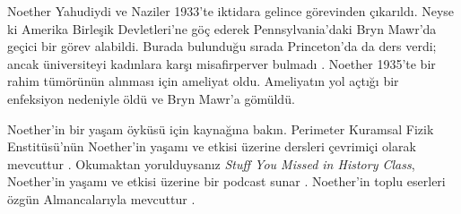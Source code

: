 Noether Yahudiydi ve Naziler 1933'te iktidara gelince görevinden çıkarıldı.
Neyse ki Amerika Birleşik Devletleri'ne göç ederek Pennsylvania'daki Bryn
Mawr'da geçici bir görev alabildi. Burada bulunduğu sırada Princeton'da da
ders verdi; ancak üniversiteyi kadınlara karşı misafirperver bulmadı
\citep[81]{Dick1981}. Noether 1935'te bir rahim tümörünün alınması için
ameliyat oldu. Ameliyatın yol açtığı bir enfeksiyon nedeniyle öldü ve Bryn
Mawr'a gömüldü.

\begin{reading} 
Noether'in bir yaşam öyküsü için \citet{Dick1981} kaynağına bakın. Perimeter
Kuramsal Fizik Enstitüsü'nün Noether'in yaşamı ve etkisi üzerine dersleri
çevrimiçi olarak mevcuttur \citep{Perimeter2015}. Okumaktan yorulduysanız
\emph{Stuff You Missed in History Class}, Noether'in yaşamı ve etkisi üzerine
bir podcast sunar \citep{Frey2015}. Noether'in toplu eserleri özgün
Almancalarıyla mevcuttur \citep{Noether1983}.
\end{reading}

